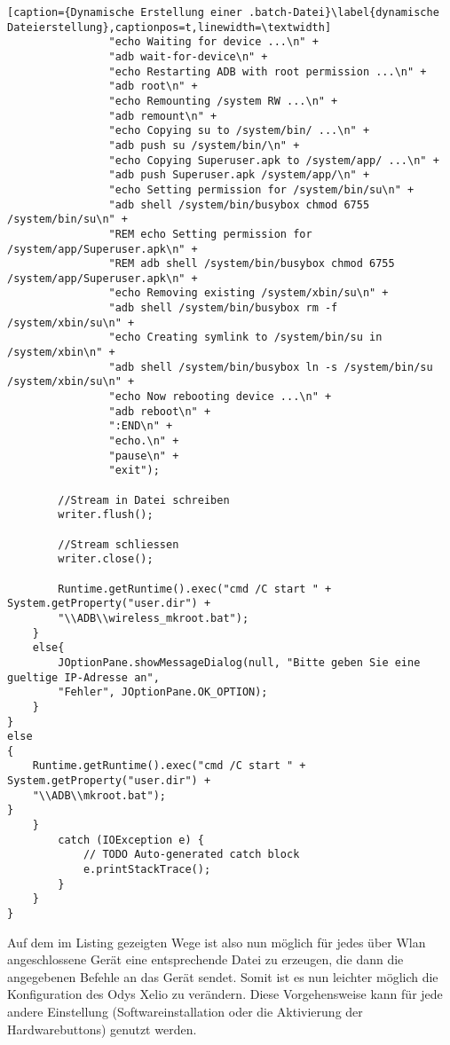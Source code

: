 \begin{flushleft}
\begin{lstlisting}[caption={Dynamische Erstellung einer .batch-Datei}\label{dynamische Dateierstellung},captionpos=t,linewidth=\textwidth]
				"echo Waiting for device ...\n" +
				"adb wait-for-device\n" +
				"echo Restarting ADB with root permission ...\n" +
				"adb root\n" +
				"echo Remounting /system RW ...\n" +
				"adb remount\n" +
				"echo Copying su to /system/bin/ ...\n" +
				"adb push su /system/bin/\n" +
				"echo Copying Superuser.apk to /system/app/ ...\n" +
				"adb push Superuser.apk /system/app/\n" +
				"echo Setting permission for /system/bin/su\n" +
				"adb shell /system/bin/busybox chmod 6755 /system/bin/su\n" +
				"REM echo Setting permission for /system/app/Superuser.apk\n" +
				"REM adb shell /system/bin/busybox chmod 6755 /system/app/Superuser.apk\n" +
				"echo Removing existing /system/xbin/su\n" +
				"adb shell /system/bin/busybox rm -f /system/xbin/su\n" +
				"echo Creating symlink to /system/bin/su in /system/xbin\n" +
				"adb shell /system/bin/busybox ln -s /system/bin/su /system/xbin/su\n" +
				"echo Now rebooting device ...\n" +
				"adb reboot\n" +
				":END\n" +
				"echo.\n" +
				"pause\n" +
				"exit");
				
		//Stream in Datei schreiben
		writer.flush();
								
		//Stream schliessen
		writer.close();
								
		Runtime.getRuntime().exec("cmd /C start " + System.getProperty("user.dir") + 
		"\\ADB\\wireless_mkroot.bat");
	}
	else{
		JOptionPane.showMessageDialog(null, "Bitte geben Sie eine gueltige IP-Adresse an", 
		"Fehler", JOptionPane.OK_OPTION);
	}
}
else
{
	Runtime.getRuntime().exec("cmd /C start " + System.getProperty("user.dir") + 
	"\\ADB\\mkroot.bat");
}	
	}
		catch (IOException e) {
			// TODO Auto-generated catch block
			e.printStackTrace();
		}
	}
}
\end{lstlisting}

Auf dem im Listing gezeigten Wege ist also nun möglich für jedes über Wlan angeschlossene Gerät eine entsprechende Datei zu erzeugen, die dann die angegebenen Befehle an das Gerät sendet. Somit ist es nun leichter möglich die Konfiguration des Odys Xelio zu verändern. Diese Vorgehensweise kann für jede andere Einstellung (Softwareinstallation oder die Aktivierung der Hardwarebuttons) genutzt werden. 


\end{flushleft}
